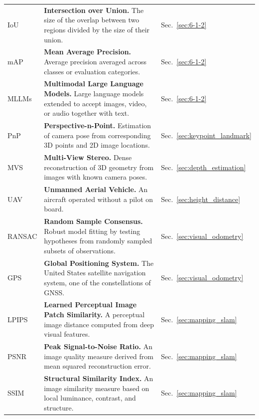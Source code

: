 \begin{longtable}{lll}
    IoU & \textbf{Intersection over Union.} The size of the overlap between two regions divided by the size of their union. & Sec.~\ref{sec:6-1-2} \\
    
    mAP & \textbf{Mean Average Precision.} Average precision averaged across classes or evaluation categories. & Sec.~\ref{sec:6-1-2} \\
    
    MLLMs & \textbf{Multimodal Large Language Models.} Large language models extended to accept images, video, or audio together with text. & Sec.~\ref{sec:6-1-2} \\
    
    PnP & \textbf{Perspective-n-Point.} Estimation of camera pose from corresponding 3D points and 2D image locations. & Sec.~\ref{sec:keypoint_landmark} \\
    
    MVS & \textbf{Multi-View Stereo.} Dense reconstruction of 3D geometry from images with known camera poses. & Sec.~\ref{sec:depth_estimation} \\
    
    UAV & \textbf{Unmanned Aerial Vehicle.} An aircraft operated without a pilot on board. & Sec.~\ref{sec:height_distance} \\
    
    RANSAC & \textbf{Random Sample Consensus.} Robust model fitting by testing hypotheses from randomly sampled subsets of observations. & Sec.~\ref{sec:visual_odometry} \\
    
    GPS & \textbf{Global Positioning System.} The United States satellite navigation system, one of the constellations of GNSS. & Sec.~\ref{sec:visual_odometry} \\
    
    LPIPS & \textbf{Learned Perceptual Image Patch Similarity.} A perceptual image distance computed from deep visual features. & Sec.~\ref{sec:mapping_slam} \\
    
    PSNR & \textbf{Peak Signal-to-Noise Ratio.} An image quality measure derived from mean squared reconstruction error. & Sec.~\ref{sec:mapping_slam} \\
    
    SSIM & \textbf{Structural Similarity Index.} An image similarity measure based on local luminance, contrast, and structure. & Sec.~\ref{sec:mapping_slam} \\
    

\end{longtable}
